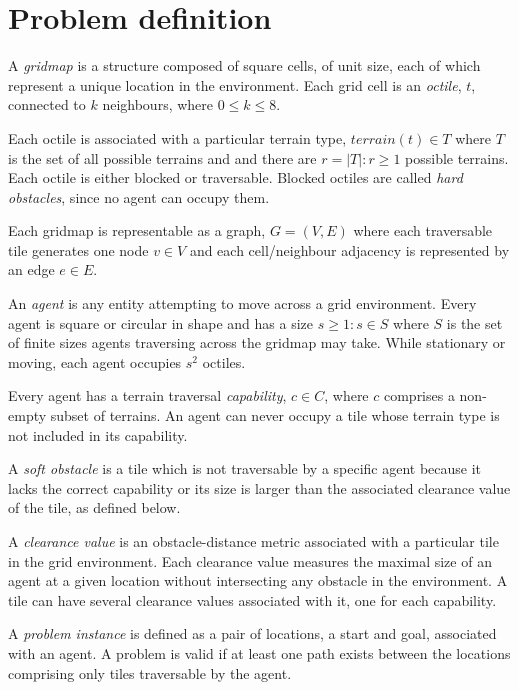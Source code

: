 \section{Problem definition}
A \emph{gridmap} is a structure composed of square cells, of unit size, each of which represent a unique location in the environment. 
Each grid cell is an \emph{octile}, $t$, connected to $k$ neighbours, where  $0 \leq k \leq 8$. 
\par \indent
Each octile is associated with a particular terrain type, $terrain(t) \in T$ where $T$ is the set of all possible terrains and and there are $r = |T| : r \geq 1$ possible terrains.
Each octile is either blocked or traversable. 
Blocked octiles are called \emph{hard obstacles}, since no agent can occupy them.
\par \indent
Each gridmap is representable as a graph, $G = (V, E)$ where each traversable tile generates one node $v \in V$ and each cell/neighbour adjacency is represented by an edge $e \in E$.
\par \indent
An \emph{agent} is any entity attempting to move across a grid environment. 
Every agent is square or circular in shape and has a size $s \geq 1 : s \in S$ where $S$ is the set of finite sizes agents traversing across the gridmap may take.
While stationary or moving, each agent occupies $s^2$ octiles. 
\par \indent
Every agent has a terrain traversal \emph{capability}, $c \in C$, where $c$ comprises a non-empty subset of terrains.
An agent can never occupy a tile whose terrain type is not included in its capability.
\par \indent 
A \emph{soft obstacle} is a tile which is not traversable by a specific agent because it lacks the correct capability or its size is larger than the associated clearance value of the tile, as defined below. 
\par \indent
A \emph{clearance value} is an obstacle-distance metric associated with a particular tile in the grid environment. 
Each clearance value measures the maximal size of an agent at a given location without intersecting any obstacle in the environment. 
A tile can have several clearance values associated with it, one for each capability. 
\par \indent
A \emph{problem instance} is defined as a pair of locations, a start and goal, associated with an agent. A problem is valid if at least one path exists between the locations comprising only tiles traversable by the agent. 
